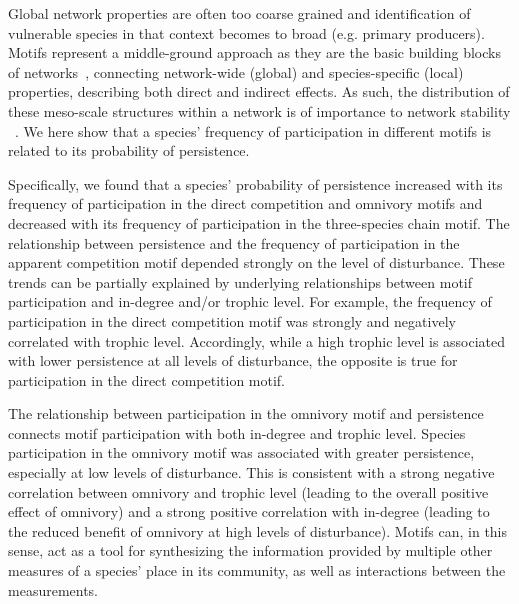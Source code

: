 \documentclass[12pt]{article}
\begin{document}
\begin{spacing}{2.0}
Global network properties are often too coarse grained and identification of vulnerable species in that context becomes to broad (e.g. primary producers). Motifs represent a middle-ground approach as they are the basic building blocks of networks~\citep{Milo2002}, connecting network-wide (global) and species-specific (local) properties, describing both direct and indirect effects. 
As such, the distribution of these meso-scale structures within a network is of importance to network stability ~\citep{prill2005dynamic, bascompte2005simple}.
We here show that a species' frequency of participation in different motifs is related to its probability of persistence.


Specifically, we found that a species' probability of persistence increased with its frequency of participation in the direct competition and omnivory motifs and decreased with its frequency of participation in the three-species chain motif.
The relationship between persistence and the frequency of participation in the apparent competition motif depended strongly on the level of disturbance.
These trends can be partially explained by underlying relationships between motif participation and in-degree and/or trophic level.
For example, the frequency of participation in the direct competition motif was strongly and negatively correlated with trophic level.
Accordingly, while a high trophic level is associated with lower persistence at all levels of disturbance, the opposite is true for participation in the direct competition motif.


The relationship between participation in the omnivory motif and persistence connects motif participation with both in-degree and trophic level.
Species participation in the omnivory motif was associated with greater persistence, especially at low levels of disturbance.
This is consistent with a strong negative correlation between omnivory and trophic level (leading to the overall positive effect of omnivory) and a strong positive correlation with in-degree (leading to the reduced benefit of omnivory at high levels of disturbance). 
Motifs can, in this sense, act as a tool for synthesizing the information provided by multiple other measures of a species' place in its community, as well as interactions between the measurements.



\end{spacing}
\end{document}
